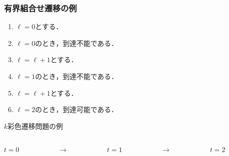 \documentclass[dvipdfmx,11pt]{beamer}
\begin{document}
\begin{frame}\frametitle{有界組合せ遷移の例}

  \begin{enumerate}
    \item $\ell = 0$とする．
    \item $\ell = 0$のとき，到達不能である．
    \item $\ell = \ell + 1$とする．
    \item $\ell = 1$のとき，到達不能である．
    \item $\ell = \ell + 1$とする．
    \item $\ell = 2$のとき，到達可能である． 
  \end{enumerate}

  \begin{exampleblock}{$k$彩色遷移問題の例}
    \begin{columns}
      \begin{column}{0.3\textwidth}
        \centering
        
        $t=0$
      \end{column}
      \begin{column}{0.05\textwidth}
        \textbf{$\longrightarrow$}
      \end{column}
      \begin{column}[]{0.3\textwidth}
        \centering
        
        $t=1$
      \end{column}
      \begin{column}{0.05\textwidth}
        \textbf{$\longrightarrow$}
      \end{column}
      \begin{column}{0.3\textwidth}
        \centering
        
        $t=2$
      \end{column}
    \end{columns}
  \end{exampleblock}
  
\end{frame}
\end{document}
